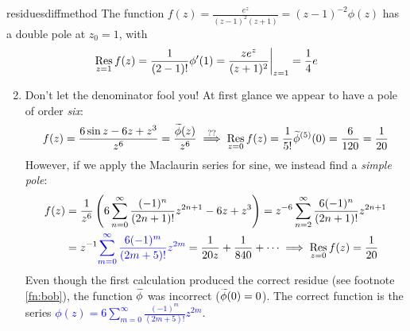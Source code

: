 \begin{examples}{}{residuesdiffmethod}
	\exstart The function $f(z)=\frac{e^z}{(z-1)^2(z+1)}=(z-1)^{-2}\phi(z)$
	has a double pole at $z_0=1$, with
	\[
		\operatorname*{Res}_{z=1}f(z)=\frac 1{(2-1)!}\phi'(1)=\frac{ze^z}{(z+1)^2}\bigg|_{z=1} =\frac 14e
	\]
	\begin{enumerate}\setcounter{enumi}{1}
	  \item\label{ex:residuesdiffmethod2} Don't let the denominator fool you! At first glance we appear to have a pole of order \emph{six}: 
		\[
			f(z)=\frac{6\sin z-6z+z^3}{z^6}=\frac{\smash[t]{\widetilde\phi(z)}}{z^6}\overset{\text{??}}{\implies} \operatorname*{Res}_{z=0}f(z)=\frac 1{5!}\widetilde\phi^{(5)}(0)=\frac 6{120}=\frac 1{20}
		\]
		However, if we apply the Maclaurin series for sine, we instead find a \emph{simple pole}:
		\begin{align*}
		  f(z)&=\frac 1{z^6}\left(6\sum_{n=0}^\infty\frac{(-1)^n}{(2n+1)!}z^{2n+1}-6z+z^3\right)
		  =z^{-6}\sum_{n=2}^\infty\frac{6(-1)^n}{(2n+1)!}z^{2n+1}\\
		  &=z^{-1}\textcolor{blue}{\sum_{m=0}^\infty\frac{6(-1)^m}{(2m+5)!}z^{2m}}
		  =\frac 1{20z}+\frac 1{840}+\cdots
		  \implies \operatorname*{Res}_{z=0}f(z)=\frac 1{20}
	  \end{align*}
	  Even though the first calculation produced the correct residue (see footnote \ref{fn:bob}), the function $\smash[t]{\widetilde\phi}$ was incorrect ($\smash[t]{\widetilde\phi}(0)=0$). The correct function is the series \textcolor{blue}{$\phi(z)=6\sum\limits_{m=0}^\infty\frac{(-1)^m}{(2m+5)!}z^{2m}$}.
	\end{enumerate}
\end{examples}






% 


